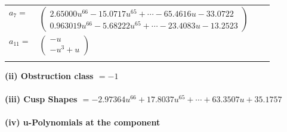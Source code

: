 \documentclass[1p]{elsarticle_modified}
\theoremstyle{definition}
\begin{document}
\begin{tabular}{m{7pt} m{180pt} m{7pt} m{180pt} }
\flushright $a_{7}=$&$\begin{pmatrix}2.65000 u^{66}-15.0717 u^{65}+\cdots-65.4616 u-33.0722\\0.963019 u^{66}-5.68222 u^{65}+\cdots-23.4083 u-13.2523\end{pmatrix}$ \\
\flushright $a_{11}=$&$\begin{pmatrix}- u\\- u^3+u\end{pmatrix}$\\&\end{tabular}
\flushleft \textbf{(ii) Obstruction class $= -1$}\\~\\
\flushleft \textbf{(iii) Cusp Shapes $= -2.97364 u^{66}+17.8037 u^{65}+\cdots+63.3507 u+35.1757$}\\~\\
\newpage\renewcommand{\arraystretch}{1}
\flushleft \textbf{(iv) u-Polynomials at the component}\newline \\
\end{document}
